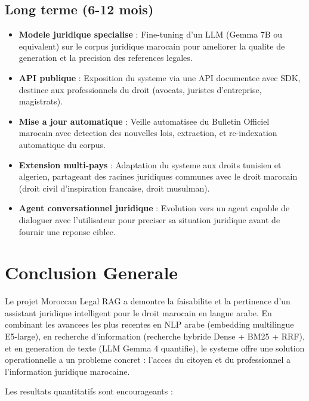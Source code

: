 \subsection{Long terme (6-12 mois)}

\begin{itemize}
    \item \textbf{Modele juridique specialise} : Fine-tuning d'un LLM (Gemma 7B ou equivalent) sur le corpus juridique marocain pour ameliorer la qualite de generation et la precision des references legales.

    \item \textbf{API publique} : Exposition du systeme via une API documentee avec SDK, destinee aux professionnels du droit (avocats, juristes d'entreprise, magistrats).

    \item \textbf{Mise a jour automatique} : Veille automatisee du Bulletin Officiel marocain avec detection des nouvelles lois, extraction, et re-indexation automatique du corpus.

    \item \textbf{Extension multi-pays} : Adaptation du systeme aux droits tunisien et algerien, partageant des racines juridiques communes avec le droit marocain (droit civil d'inspiration francaise, droit musulman).

    \item \textbf{Agent conversationnel juridique} : Evolution vers un agent capable de dialoguer avec l'utilisateur pour preciser sa situation juridique avant de fournir une reponse ciblee.
\end{itemize}

\section{Conclusion Generale}

Le projet Moroccan Legal RAG a demontre la faisabilite et la pertinence d'un assistant juridique intelligent pour le droit marocain en langue arabe. En combinant les avancees les plus recentes en NLP arabe (embedding multilingue E5-large), en recherche d'information (recherche hybride Dense + BM25 + RRF), et en generation de texte (LLM Gemma 4 quantifie), le systeme offre une solution operationnelle a un probleme concret : l'acces du citoyen et du professionnel a l'information juridique marocaine.

Les resultats quantitatifs sont encourageants :

